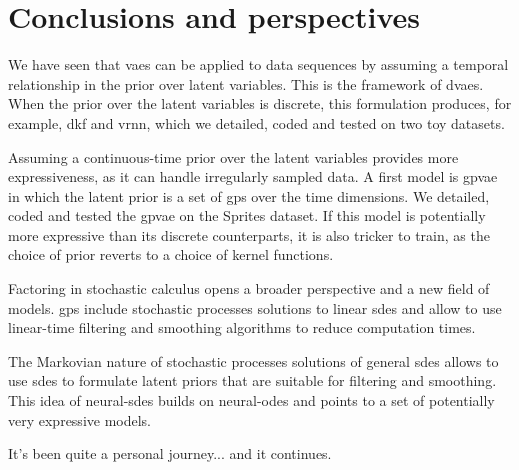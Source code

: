 \chapter{Conclusions and perspectives}\label{sec:Conclusions}

We have seen that \glspl{vae} can be applied to data sequences by assuming a temporal relationship in the prior over latent variables. 
This is the framework of \glspl{dvae}. When the prior over the latent variables is discrete, this formulation produces, for example, 
\gls{dkf} and \gls{vrnn}, which we detailed, coded and tested on two toy datasets.

Assuming a continuous-time prior over the latent variables provides more expressiveness, as it can handle irregularly sampled data. 
A first model is \gls{gpvae} in which the latent prior is a set of \glspl{gp} over the time dimensions. We detailed, coded and tested 
the \gls{gpvae} on the Sprites dataset. If this model is potentially more expressive than its discrete counterparts, it is also 
tricker to train, as the choice of prior reverts to a choice of kernel functions.

Factoring in stochastic calculus opens a broader perspective and a new field of models. \glspl{gp} include stochastic processes 
solutions to linear \glspl{sde} and allow to use linear-time filtering and smoothing algorithms to reduce computation times. 

The Markovian nature of stochastic processes solutions of general \glspl{sde} allows to use \glspl{sde} to formulate latent priors 
that are suitable for filtering and smoothing. This idea of \glspl{neural-sde} builds on \glspl{neural-ode} and points to a 
set of potentially very expressive models.

It's been quite a personal journey... and it continues.
